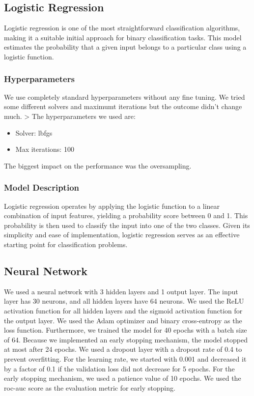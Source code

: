 \documentclass[a4, 10 pt, conference]{ieeeconf}  %
\begin{document}
\subsection{Logistic Regression}
Logistic regression is one of the most straightforward classification algorithms, making it a suitable initial approach for binary classification tasks.
This model estimates the probability that a given input belongs to a particular class using a logistic function.

\subsubsection{Hyperparameters}
We use completely standard hyperparameters without any fine tuning.
We tried some different solvers and maximumt iterations but the outcome didn't change much. >
The hyperparameters we used are:
\begin{itemize}
  \item Solver: lbfgs
  \item Max iterations: 100
\end{itemize}
The biggest impact on the performance was the oversampling.

\subsubsection{Model Description}
Logistic regression operates by applying the logistic function to a linear combination of input features, yielding a probability score between 0 and 1.
This probability is then used to classify the input into one of the two classes. Given its simplicity and ease of implementation, logistic regression serves
as an effective starting point for classification problems.



\subsection{Neural Network}
We used a neural network with 3 hidden layers and 1 output layer. The input layer has 30 neurons, and all hidden layers have 64 neurons. We used the ReLU activation function for all hidden layers and the sigmoid activation function for the output layer. We used the Adam optimizer and binary cross-entropy as the loss function. Furthermore, we trained the
model for 40 epochs with a batch size of 64. Because we implemented an early stopping mechanism, the model stopped at most after 24 epochs. We used a dropout layer with a dropout rate of 0.4 to prevent overfitting. For the learning rate, we started with 0.001 and decreased it by a factor of 0.1 if the validation loss did not decrease for 5 epochs.
For the early stopping mechanism, we used a patience value of 10 epochs. We used the roc-auc score as the evaluation metric for early stopping.
\end{document}
